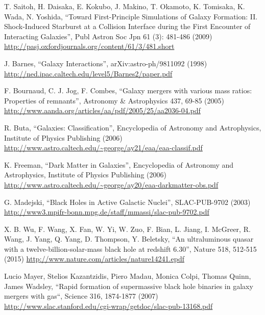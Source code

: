 \documentclass[11pt]{article}
\begin{document}
\begin{thebibliography}{99}
 T. Saitoh, H. Daisaka, E. Kokubo, J. Makino, T. Okamoto, K. Tomisaka, K. Wada, N. Yoshida, ``Toward First-Principle Simulations of Galaxy Formation: II. Shock-Induced Starburst at a Collision Interface during the First Encounter of Interacting Galaxies'', Publ Astron Soc Jpn 61 (3): 481-486 (2009) \url{http://pasj.oxfordjournals.org/content/61/3/481.short}

 J.  Barnes, ``Galaxy Interactions'', arXiv:astro-ph/9811092 (1998) \url{http://ned.ipac.caltech.edu/level5/Barnes2/paper.pdf}

 F. Bournaud, C. J. Jog, F. Combes, ``Galaxy mergers with various mass ratios: Properties of remnants'', Astronomy \& Astrophysics 437, 69-85 (2005) \url{http://www.aanda.org/articles/aa/pdf/2005/25/aa2036-04.pdf}

 R. Buta, ``Galaxies: Classification'', Encyclopedia of Astronomy and Astrophysics, Institute of Physics Publishing (2006) \url{http://www.astro.caltech.edu/~george/ay21/eaa/eaa-classif.pdf}
	
 K. Freeman, ``Dark Matter in Galaxies'', Encyclopedia of Astronomy and Astrophysics, Institute of Physics Publishing (2006) \url{http://www.astro.caltech.edu/~george/ay20/eaa-darkmatter-obs.pdf}

 G. Madejski, ``Black Holes in Active Galactic Nuclei'', SLAC-PUB-9702 (2003) \url{http://www3.mpifr-bonn.mpg.de/staff/mmassi/slac-pub-9702.pdf}

 X. B. Wu, F. Wang, X. Fan, W. Yi,	W. Zuo, F. Bian, L. Jiang, I. McGreer, R. Wang,	J. Yang, Q. Yang, D. Thompson, Y. Beletsky, ``An ultraluminous quasar with a twelve-billion-solar-mass black hole at redshift 6.30'', Nature 518, 512-515 (2015) \url{http://www.nature.com/articles/nature14241.epdf}

 Lucio Mayer, Stelios Kazantzidis, Piero Madau, Monica Colpi, Thomas Quinn, James Wadsley, ``Rapid formation of supermassive black hole binaries
in galaxy mergers with gas``, Science 316, 1874-1877 (2007) \url{http://www.slac.stanford.edu/cgi-wrap/getdoc/slac-pub-13168.pdf}

\end{thebibliography}

\end{document}
